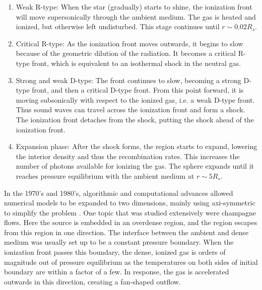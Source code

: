 \documentclass[useAMS,usenatbib,a4paper]{mn2e}
\begin{document}
\begin{enumerate}
\item Weak R-type:  When the star (gradually) starts to shine, the
  ionization front will move supersonically through the ambient
  medium.  The gas is heated and ionized, but otherwise left
  undisturbed.  This stage continues until $r \sim 0.02R_s$.
\item Critical R-type:  As the ionization front moves outwards, it
  begins to slow because of the geometric dilution of the radiation.
  It becomes a critical R-type front, which is equivalent to an
  isothermal shock in the neutral gas.
\item Strong and weak D-type:  The front continues to slow, becoming a
  strong D-type front, and then a critical D-type front.  From this
  point forward, it is moving subsonically with respect to the ionized
  gas, i.e. a weak D-type front.  Thus sound waves can travel across
  the ionization front and form a shock.  The ionization front
  detaches from the shock, putting the shock ahead of the ionization
  front.
\item Expansion phase:  After the shock forms, the \hii region
  starts to expand, lowering the interior density and thus the
  recombination rates.  This increases the number of photons available
  for ionizing the gas.  The sphere expands until it reaches pressure
  equilibrium with the ambient medium at $r \sim 5R_s$.
\end{enumerate}
%

In the 1970's and 1980's, algorithmic and computational advances
allowed numerical models to be expanded to two dimensions, mainly
using axi-symmetric to simplify the problem
\citep[e.g.][]{Bodenheimer79, Sandford82, Yorke83}.  One topic that was
studied extensively were champagne flows.  Here the source is embedded
in an overdense region, and the \hii region escapes from this
region in one direction.  The interface between the ambient and dense
medium was usually set up to be a constant pressure boundary.  When
the ionization front passes this boundary, the dense, ionized gas is
orders of magnitude out of pressure equilibrium as the temperatures on
both sides of initial boundary are within a factor of a few.  In
response, the gas is accelerated outwards in this direction, creating
a fan-shaped outflow.
\end{document}
